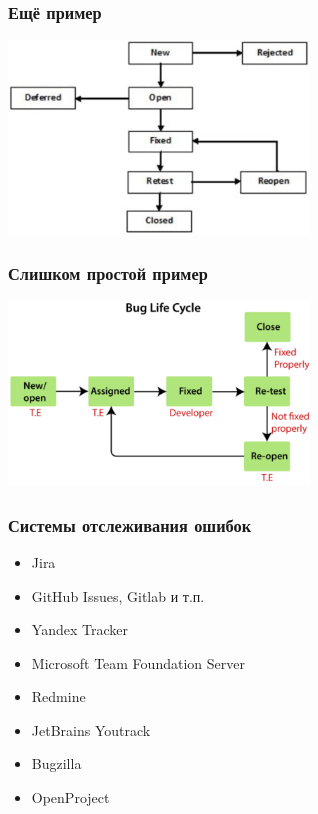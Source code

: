 \documentclass{../../slides-style}
\begin{document}
    \begin{frame}
        \frametitle{Ещё пример}
        \begin{center}
            \includegraphics[width=0.6\textwidth]{bugLifecycle2.png}
        \end{center}
    \end{frame}

    \begin{frame}
        \frametitle{Слишком простой пример}
        \begin{center}
            \includegraphics[width=0.6\textwidth]{bugLifecycle3.png}
        \end{center}
    \end{frame}

    \begin{frame}
        \frametitle{Системы отслеживания ошибок}
        \begin{itemize}
            \item Jira
            \item GitHub Issues, Gitlab и т.п.
            \item Yandex Tracker
            \item Microsoft Team Foundation Server
            \item Redmine
            \item JetBrains Youtrack
            \item Bugzilla
            \item OpenProject
        \end{itemize}
    \end{frame}
\end{document}
